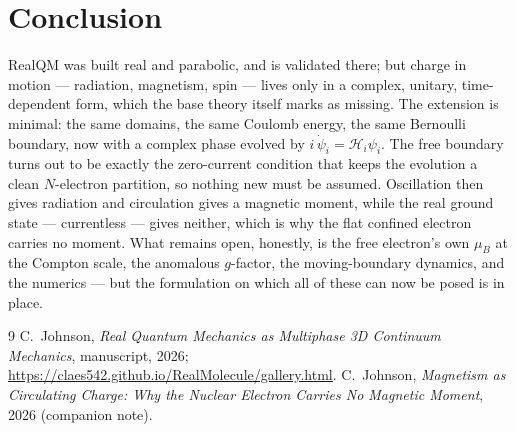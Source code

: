 \documentclass[11pt]{article}
\begin{document}
\section{Conclusion}
\label{sec:concl}

RealQM was built real and parabolic, and is validated there; but charge in motion --- radiation,
magnetism, spin --- lives only in a complex, unitary, time-dependent form, which the base theory itself
marks as missing. The extension is minimal: the same domains, the same Coulomb energy, the same Bernoulli
boundary, now with a complex phase evolved by $i\,\dot\psi_i=\mathcal H_i\psi_i$. The free boundary
turns out to be exactly the zero-current condition that keeps the evolution a clean $N$-electron
partition, so nothing new must be assumed. Oscillation then gives radiation and circulation gives a
magnetic moment, while the real ground state --- currentless --- gives neither, which is why the flat
confined electron carries no moment. What remains open, honestly, is the free electron's own $\mu_B$ at
the Compton scale, the anomalous $g$-factor, the moving-boundary dynamics, and the numerics --- but the
formulation on which all of these can now be posed is in place.

\begin{thebibliography}{9}
 C.~Johnson, \emph{Real Quantum Mechanics as Multiphase 3D Continuum Mechanics},
manuscript, 2026; \url{https://claes542.github.io/RealMolecule/gallery.html}.
 C.~Johnson, \emph{Magnetism as Circulating Charge: Why the Nuclear Electron
Carries No Magnetic Moment}, 2026 (companion note).
\end{thebibliography}
\end{document}
